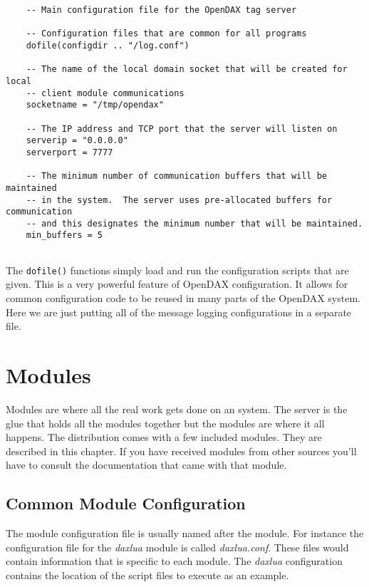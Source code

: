	
	\begin{verbatim}
	-- Main configuration file for the OpenDAX tag server
	
	-- Configuration files that are common for all programs
	dofile(configdir .. "/log.conf")
	
	-- The name of the local domain socket that will be created for local 
	-- client module communications
	socketname = "/tmp/opendax"
	
	-- The IP address and TCP port that the server will listen on
	serverip = "0.0.0.0"
	serverport = 7777
	
	-- The minimum number of communication buffers that will be maintained
	-- in the system.  The server uses pre-allocated buffers for communication
	-- and this designates the minimum number that will be maintained.
	min_buffers = 5
	
	\end{verbatim}
	
	The \texttt{dofile()} functions simply load and run the configuration scripts
	that are given.  This is a very powerful feature of OpenDAX configuration.  It
	allows for common configuration code to be reused in many parts of the OpenDAX
	system.  Here we are just putting all of the message logging configurations in a
	separate file.
	
	\chapter{Modules}
	Modules are where all the real work gets done on an \opendax system.  The server
	is the glue that holds all the modules together but the modules are where it all
	happens.  The \opendax distribution comes with a few included modules.  They are
	described in this chapter.  If you have received modules from other sources
	you'll have to consult the documentation that came with that module.
	
	\section{Common Module Configuration}
	
	The module configuration file is usually named after the module.  For instance
	the configuration file for the \emph{daxlua} module is called
	\emph{daxlua.conf}.  These files would contain information that is specific to
	each module.  The \emph{daxlua} configuration contains the location of the
	script files to execute as an example.
	
